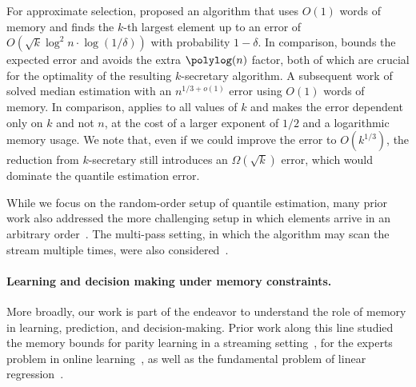 For approximate selection, \cite{guha2009stream}  proposed an algorithm that uses $O(1)$ words of memory and finds the $k$-th largest element up to an error of $O(\sqrt{k}\log^2 n\cdot\log(1/\delta))$ with probability $1 - \delta$. In comparison,  bounds the expected error and avoids the extra $\polylog(n)$ factor, both of which are crucial for the optimality of the resulting $k$-secretary algorithm. A subsequent work of~\cite{MV12} solved median estimation with an $n^{1/3 + o(1)}$ error using $O(1)$ words of memory. In comparison,  applies to all values of $k$ and makes the error dependent only on $k$ and not $n$, at the cost of a larger exponent of $1/2$ and a logarithmic memory usage. We note that, even if we could improve the error to $O(k^{1/3})$, the reduction from $k$-secretary still introduces an $\Omega(\sqrt{k})$ error, which would dominate the quantile estimation error.

While we focus on the random-order setup of quantile estimation, many prior work also addressed the more challenging setup in which elements arrive in an arbitrary order~\cite{MP80,manku1998approximate,KLL16,masson2019ddsketch,gupta2024optimal}. The multi-pass setting, in which the algorithm may scan the stream multiple times, were also considered~\cite{MP80,guha2009stream}.

\paragraph{Learning and decision making under memory constraints.} More broadly, our work is part of the endeavor to understand the role of memory in learning, prediction, and decision-making. Prior work along this line studied the memory bounds for parity learning in a streaming setting~\cite{valiant2016information,steinhardt2016memory,kol2017time,raz2018fast, garg2018extractor}, for the experts problem in online learning~\cite{srinivas2022memory,PZ23,peng2023near}, as well as the fundamental problem of linear regression~\cite{sharan2019memory, marsden2022efficient, blanchard2023memory, blanchard2024gradient}.
